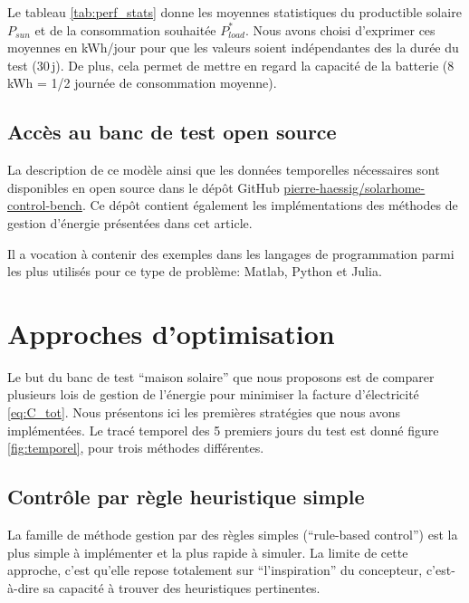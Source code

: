 \documentclass[a4paper,10pt,twocolumn]{article}
\begin{document}
Le tableau \ref{tab:perf_stats} donne les moyennes statistiques du productible solaire $P_{sun}$
et de la consommation souhaitée $P_{load}^*$.
Nous avons choisi d'exprimer ces moyennes en kWh/jour pour que les valeurs soient indépendantes
des la durée du test (30\,j). De plus, cela permet de mettre en regard la capacité de la batterie
(8 kWh = 1/2 journée de consommation moyenne).


\subsection{Accès au banc de test open source}

La description de ce modèle ainsi que les données temporelles nécessaires sont
disponibles en open source dans le dépôt GitHub \href{https://github.com/pierre-haessig/solarhome-control-bench}{pierre-haessig/solarhome-control-bench}.
Ce dépôt contient également les implémentations des méthodes de gestion d'énergie présentées dans cet article.

Il a vocation à contenir des exemples dans les langages de programmation
parmi les plus utilisés pour ce type de problème:
Matlab, Python et Julia.

\section{Approches d'optimisation}
\label{s:opt_meth}

Le but du banc de test ``maison solaire'' que nous proposons est de comparer
plusieurs lois de gestion de l'énergie pour minimiser la facture d'électricité \eqref{eq:C_tot}.
Nous présentons ici les premières stratégies que nous avons implémentées.
Le tracé temporel des 5 premiers jours du test est donné
figure \ref{fig:temporel}, pour trois méthodes différentes.

\subsection{Contrôle par règle heuristique simple}
\label{ss:heuris}

La famille de méthode gestion par des règles simples (``rule-based control'')
est la plus simple à implémenter et la plus rapide à simuler.
La limite de cette approche, c'est qu'elle repose totalement
sur ``l'inspiration'' du concepteur, c'est-à-dire sa capacité à trouver
des heuristiques pertinentes.
\end{document}
